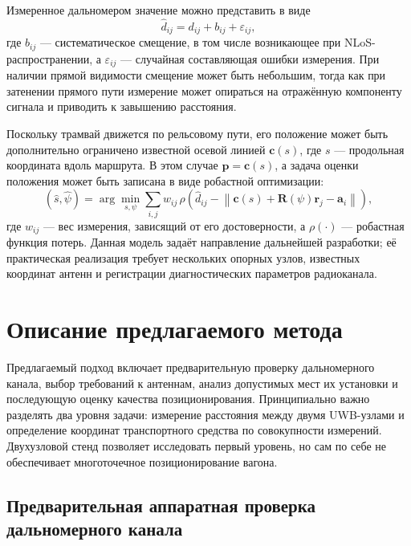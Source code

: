 \documentclass{misisarticle}
\begin{document}
Измеренное дальномером значение можно представить в виде
\begin{equation}
    \widehat d_{ij}=d_{ij}+b_{ij}+\varepsilon_{ij},
\end{equation}
где \(b_{ij}\) — систематическое смещение, в том числе возникающее при NLoS-распространении, а \(\varepsilon_{ij}\) — случайная составляющая ошибки измерения. При наличии прямой видимости смещение может быть небольшим, тогда как при затенении прямого пути измерение может опираться на отражённую компоненту сигнала и приводить к завышению расстояния.

Поскольку трамвай движется по рельсовому пути, его положение может быть дополнительно ограничено известной осевой линией \(\mathbf{c}(s)\), где \(s\) — продольная координата вдоль маршрута. В этом случае \(\mathbf{p}=\mathbf{c}(s)\), а задача оценки положения может быть записана в виде робастной оптимизации:
\begin{equation}
    (\widehat s,\widehat\psi)=
    \arg\min_{s,\psi}\sum_{i,j}w_{ij}\,
    \rho\!\left(\widehat d_{ij}-
    \left\|\mathbf{c}(s)+\mathbf{R}(\psi)\mathbf{r}_j-\mathbf{a}_i\right\|\right),
\end{equation}
где \(w_{ij}\) — вес измерения, зависящий от его достоверности, а \(\rho(\cdot)\) — робастная функция потерь. Данная модель задаёт направление дальнейшей разработки; её практическая реализация требует нескольких опорных узлов, известных координат антенн и регистрации диагностических параметров радиоканала.

\section{Описание предлагаемого метода}

Предлагаемый подход включает предварительную проверку дальномерного канала, выбор требований к антеннам, анализ допустимых мест их установки и последующую оценку качества позиционирования. Принципиально важно разделять два уровня задачи: измерение расстояния между двумя UWB-узлами и определение координат транспортного средства по совокупности измерений. Двухузловой стенд позволяет исследовать первый уровень, но сам по себе не обеспечивает многоточечное позиционирование вагона.

\subsection{Предварительная аппаратная проверка дальномерного канала}
\end{document}
